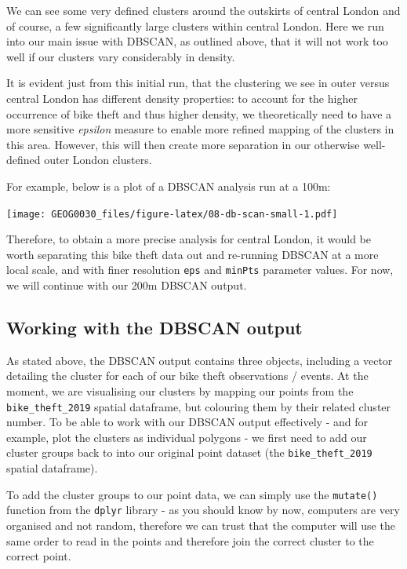 \documentclass[
]{book}
\begin{document}
We can see some very defined clusters around the outskirts of central London and of course, a few significantly large clusters within central London. Here we run into our main issue with DBSCAN, as outlined above, that it will not work too well if our clusters vary considerably in density.

It is evident just from this initial run, that the clustering we see in outer versus central London has different density properties: to account for the higher occurrence of bike theft and thus higher density, we theoretically need to have a more sensitive \emph{epsilon} measure to enable more refined mapping of the clusters in this area. However, this will then create more separation in our otherwise well-defined outer London clusters.

For example, below is a plot of a DBSCAN analysis run at a 100m:

\texttt{[image: GEOG0030\_files/figure-latex/08-db-scan-small-1.pdf]}

Therefore, to obtain a more precise analysis for central London, it would be worth separating this bike theft data out and re-running DBSCAN at a more local scale, and with finer resolution \texttt{eps} and \texttt{minPts} parameter values. For now, we will continue with our 200m DBSCAN output.

\hypertarget{working-with-the-dbscan-output}{%
\subsection{Working with the DBSCAN output}\label{working-with-the-dbscan-output}}

As stated above, the DBSCAN output contains three objects, including a vector detailing the cluster for each of our bike theft observations / events. At the moment, we are visualising our clusters by mapping our points from the \texttt{bike\_theft\_2019} spatial dataframe, but colouring them by their related cluster number. To be able to work with our DBSCAN output effectively - and for example, plot the clusters as individual polygons - we first need to add our cluster groups back to into our original point dataset (the \texttt{bike\_theft\_2019} spatial dataframe).

To add the cluster groups to our point data, we can simply use the \texttt{mutate()} function from the \texttt{dplyr} library - as you should know by now, computers are very organised and not random, therefore we can trust that the computer will use the same order to read in the points and therefore join the correct cluster to the correct point.
\end{document}
